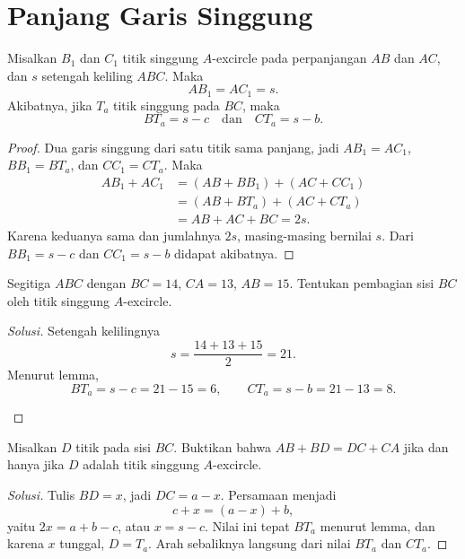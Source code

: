 \documentclass[12pt]{scrartcl}
\begin{document}
\section{Panjang Garis Singgung}

\begin{lemma}
Misalkan $B_1$ dan $C_1$ titik singgung $A$-excircle
pada perpanjangan $AB$ dan $AC$, dan $s$ setengah keliling $ABC$. Maka
\[ AB_1 = AC_1 = s. \]
Akibatnya, jika $T_a$ titik singgung pada $BC$, maka
\[ BT_a = s - c \quad\text{dan}\quad CT_a = s - b. \]
\end{lemma}
\begin{proof}
Dua garis singgung dari satu titik sama panjang, jadi $AB_1 = AC_1$,
$BB_1 = BT_a$, dan $CC_1 = CT_a$. Maka
\begin{align*}
AB_1 + AC_1 &= (AB + BB_1) + (AC + CC_1) \\
&= (AB + BT_a) + (AC + CT_a) \\
&= AB + AC + BC = 2s.
\end{align*}
Karena keduanya sama dan jumlahnya $2s$, masing-masing bernilai $s$.
Dari $BB_1 = s - c$ dan $CC_1 = s - b$ didapat akibatnya.
\end{proof}

\begin{example}
Segitiga $ABC$ dengan $BC = 14$, $CA = 13$, $AB = 15$.
Tentukan pembagian sisi $BC$ oleh titik singgung $A$-excircle.
\end{example}
\begin{proof}[Solusi]
Setengah kelilingnya
\[ s = \frac{14 + 13 + 15}{2} = 21. \]
Menurut lemma,
\[ BT_a = s - c = 21 - 15 = 6, \qquad
CT_a = s - b = 21 - 13 = 8. \]
\begin{center}
\end{center}
\end{proof}

\begin{example}
Misalkan $D$ titik pada sisi $BC$.
Buktikan bahwa $AB + BD = DC + CA$ jika dan hanya jika
$D$ adalah titik singgung $A$-excircle.
\end{example}
\begin{proof}[Solusi]
Tulis $BD = x$, jadi $DC = a - x$.
Persamaan menjadi
\[ c + x = (a - x) + b, \]
yaitu $2x = a + b - c$, atau $x = s - c$.
Nilai ini tepat $BT_a$ menurut lemma,
dan karena $x$ tunggal, $D = T_a$.
Arah sebaliknya langsung dari nilai $BT_a$ dan $CT_a$.
\end{proof}
\end{document}
